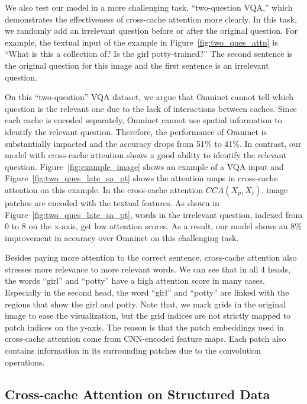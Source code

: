 \documentclass{article}
\begin{document}
We also test our model in a more challenging task, ``two-question VQA,'' which demonstrates the effectiveness of cross-cache attention more clearly. In this task, we randomly add an irrelevant question before or after the original question. For example, the textual input of the example in Figure~\ref{fig:two_ques_attn} is ``What is this a collection of? Is the girl potty-trained?'' The second sentence is the original question for this image and the first sentence is an irrelevant question. 

On this ``two-question'' VQA dataset, we argue that Omninet cannot tell which question is the relevant one due to the lack of interactions between caches. Since each cache is encoded separately, Omninet cannot use spatial information to identify the relevant question. Therefore, the performance of Omninet is substantially impacted and the accuracy drops from 51\% to 41\%. In contrast, our model with cross-cache attention shows a good ability to identify the relevant question. Figure~\ref{fig:example_image} shows an example of a VQA input and Figure~\ref{fig:two_ques_late_sa_pt} shows the attention maps in cross-cache attention on this example. In the cross-cache attention $CCA(X_{p}, X_{t})$, image patches are encoded with the textual features. As shown in Figure~\ref{fig:two_ques_late_sa_pt}, words in the irrelevant question, indexed from 0 to 8 on the x-axis, get low attention scores. As a result, our model shows an 8\% improvement in accuracy over Omninet on this challenging task.

Besides paying more attention to the correct sentence, cross-cache attention also stresses more relevance to more relevant words. We can see that in all 4 heads, the words ``girl'' and ``potty'' have a high attention score in many cases. Especially in the second head, the word ``girl'' and ``potty'' are linked with the regions that show the girl and potty. Note that, we mark grids in the original image to ease the visualization, but the grid indices are not strictly mapped to patch indices on the y-axis. The reason is that the patch embeddings used in cross-cache attention come from CNN-encoded feature maps. Each patch also contains information in its surrounding patches due to the convolution operations.

\subsection{Cross-cache Attention on Structured Data}
\end{document}
